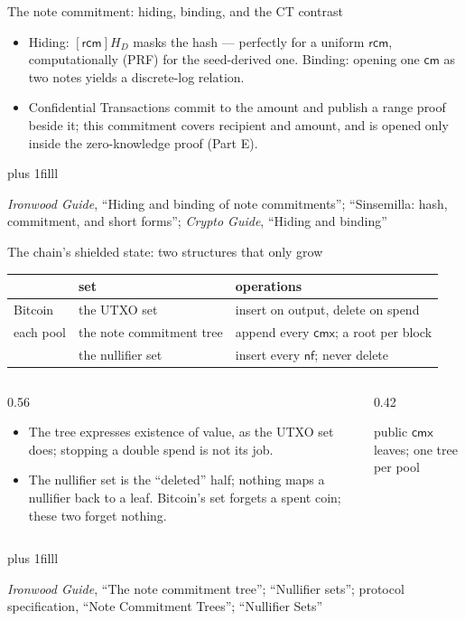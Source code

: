 \documentclass[aspectratio=169,11pt]{beamer}
\newcommand{\nfsym}{\ensuremath{\mathsf{nf}}}
\newcommand{\cmsym}{\ensuremath{\mathsf{cm}}}
\newcommand{\cmx}{\ensuremath{\mathsf{cmx}}}
\newcommand{\rcm}{\ensuremath{\mathsf{rcm}}}
\newcommand{\src}[1]{\par\vskip0pt plus 1filll
  {\fontsize{6}{7.2}\selectfont\color{arbdim}\raggedright #1\par}}
\begin{document}
\begin{frame}{The note commitment: hiding, binding, and the CT contrast}
\begin{itemize}
  \item Hiding: $[\rcm]H_D$ masks the hash --- perfectly for a uniform
    $\rcm$, computationally (PRF) for the seed-derived one. Binding:
    opening one $\cmsym$ as two notes yields a discrete-log relation.
  \item Confidential Transactions commit to the amount and publish a
    range proof beside it; this commitment covers recipient and amount,
    and is opened only inside the zero-knowledge proof (Part E).
\end{itemize}
\src{\emph{Ironwood Guide}, ``Hiding and binding of note commitments'';
  ``Sinsemilla: hash, commitment, and short forms'';
  \emph{Crypto Guide}, ``Hiding and binding''}
\end{frame}

\begin{frame}{The chain's shielded state: two structures that only grow}
\vspace*{-6pt}
\begin{center}
\footnotesize
\begin{tabular}{@{}lll@{}}
\toprule
 & set & operations \\
\midrule
Bitcoin & the UTXO set & insert on output, \alert{delete} on spend \\
each pool & the note commitment tree & append every $\cmx$; a root per
  block \\
 & the nullifier set & insert every $\nfsym$; never delete \\
\bottomrule
\end{tabular}
\end{center}
\vspace*{-2pt}
\begin{columns}[c]
\begin{column}{0.56\textwidth}
\begin{itemize}\small
  \item The tree expresses existence of value, as the UTXO set does;
    stopping a double spend is not its job.
  \item The nullifier set is the ``deleted'' half; nothing maps a
    nullifier back to a leaf. Bitcoin's set forgets a spent coin;
    these two forget nothing.
\end{itemize}
\end{column}
\begin{column}{0.42\textwidth}
\centering
\TreeFig
\par\smallskip
{\scriptsize public $\cmx$ leaves; one tree per pool}
\end{column}
\end{columns}
\src{\emph{Ironwood Guide}, ``The note commitment tree'';
  ``Nullifier sets'';
  protocol specification, ``Note Commitment Trees''; ``Nullifier Sets''}
\end{frame}
\end{document}
